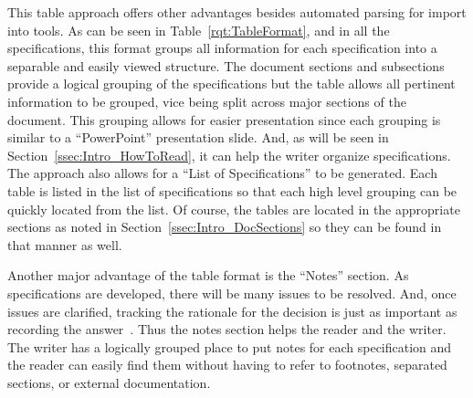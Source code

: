 This table approach offers other advantages besides automated parsing for import into tools.
As can be seen in Table~\ref{rqt:TableFormat}, and in all the specifications, this format groups all information for each specification into a separable and easily viewed structure.
The document sections and subsections provide a logical grouping of the specifications but the table allows all pertinent information to be grouped, vice being split across major sections of the document.
This grouping allows for easier presentation since each grouping is similar to a ``PowerPoint'' presentation slide.
And, as will be seen in Section~\ref{ssec:Intro_HowToRead}, it can help the writer organize specifications.
The approach also allows for a ``List of Specifications'' to be generated.
Each table is listed in the list of specifications so that each high level grouping can be quickly located from the list.
Of course, the tables are located in the appropriate sections as noted in Section~\ref{ssec:Intro_DocSections} so they can be found in that manner as well.


Another major advantage of the table format is the ``Notes'' section.
As specifications are developed, there will be many issues to be resolved.
And, once issues are clarified, tracking the rationale for the decision is just as important as recording the answer~\cite{ref__Brooks_MMM}.
Thus the notes section helps the reader and the writer.
The writer has a logically grouped place to put notes for each specification and the reader can easily find them without having to refer to footnotes, separated sections, or external documentation.


